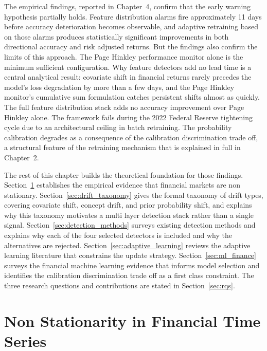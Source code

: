 The empirical findings, reported in Chapter~4, confirm that the early warning hypothesis partially holds. Feature distribution alarms fire approximately 11 days before accuracy deterioration becomes observable, and adaptive retraining based on those alarms produces statistically significant improvements in both directional accuracy and risk adjusted returns. But the findings also confirm the limits of this approach. The Page Hinkley performance monitor alone is the minimum sufficient configuration. Why feature detectors add no lead time is a central analytical result: covariate shift in financial returns rarely precedes the model's loss degradation by more than a few days, and the Page Hinkley monitor's cumulative sum formulation catches persistent shifts almost as quickly. The full feature distribution stack adds no accuracy improvement over Page Hinkley alone. The framework fails during the 2022 Federal Reserve tightening cycle due to an architectural ceiling in batch retraining. The probability calibration degrades as a consequence of the calibration discrimination trade off, a structural feature of the retraining mechanism that is explained in full in Chapter~2.

The rest of this chapter builds the theoretical foundation for those findings. Section~\ref{sec:nonstationarity} establishes the empirical evidence that financial markets are non stationary. Section~\ref{sec:drift_taxonomy} gives the formal taxonomy of drift types, covering covariate shift, concept drift, and prior probability shift, and explains why this taxonomy motivates a multi layer detection stack rather than a single signal. Section~\ref{sec:detection_methods} surveys existing detection methods and explains why each of the four selected detectors is included and why the alternatives are rejected. Section~\ref{sec:adaptive_learning} reviews the adaptive learning literature that constrains the update strategy. Section~\ref{sec:ml_finance} surveys the financial machine learning evidence that informs model selection and identifies the calibration discrimination trade off as a first class constraint. The three research questions and contributions are stated in Section~\ref{sec:rqs}.

\section{Non Stationarity in Financial Time Series}
\label{sec:nonstationarity}

